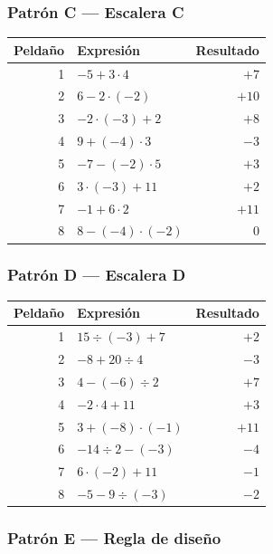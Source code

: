 \documentclass[12pt, letterpaper]{article}
\begin{document}
\subsubsection{Patrón C — Escalera C}

\begin{center}
\small
\begin{tabular}{@{}r l r@{}}
\toprule
\textbf{Peldaño} & \textbf{Expresión} & \textbf{Resultado}\\
\midrule
1 & $-5+3\cdot 4$ & $+7$\\
2 & $6-2\cdot(-2)$ & $+10$\\
3 & $-2\cdot(-3)+2$ & $+8$\\
4 & $9+(-4)\cdot 3$ & $-3$\\
5 & $-7-(-2)\cdot 5$ & $+3$\\
6 & $3\cdot(-3)+11$ & $+2$\\
7 & $-1+6\cdot 2$ & $+11$\\
8 & $8-(-4)\cdot(-2)$ & $0$\\
\bottomrule
\end{tabular}
\end{center}

\subsubsection{Patrón D — Escalera D}

\begin{center}
\small
\begin{tabular}{@{}r l r@{}}
\toprule
\textbf{Peldaño} & \textbf{Expresión} & \textbf{Resultado}\\
\midrule
1 & $15\div(-3)+7$ & $+2$\\
2 & $-8+20\div 4$ & $-3$\\
3 & $4-(-6)\div 2$ & $+7$\\
4 & $-2\cdot 4+11$ & $+3$\\
5 & $3+(-8)\cdot(-1)$ & $+11$\\
6 & $-14\div 2-(-3)$ & $-4$\\
7 & $6\cdot(-2)+11$ & $-1$\\
8 & $-5-9\div(-3)$ & $-2$\\
\bottomrule
\end{tabular}
\end{center}

\subsubsection{Patrón E — Regla de diseño}
\end{document}
